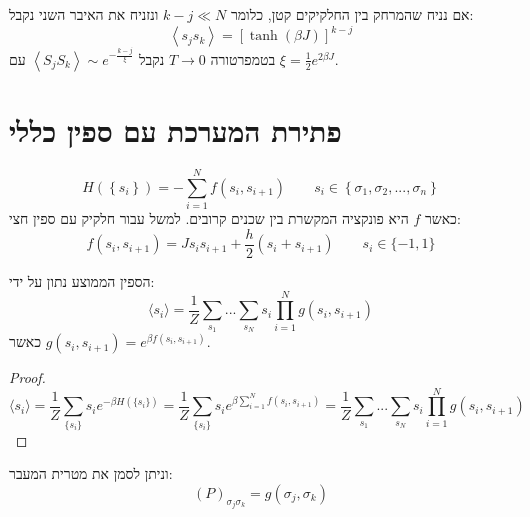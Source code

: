 \documentclass{tstextbook}
\begin{document}
\begin{corollary}
אם נניח שהמרחק בין החלקיקים קטן, כלומר \(k-j\ll N\) ונזניח את האיבר השני נקבל:
$$\left\langle s_{j}s_{k}\right\rangle=\left[\operatorname{tanh}\left(\beta J\right)\right]^{k-j}$$
בטמפרטורה \(T\to 0\) נקבל \(\left\langle S_{j}S_{k}\right\rangle\sim e^{-\frac{k-j}{\xi}}\) עם \(\xi=\frac{1}{2}e^{ 2\beta J }\).

\end{corollary}
\section{פתירת המערכת עם ספין כללי}

\begin{definition}
$$H\left(\left\{s_{i}\right\}\right)=-\sum_{i=1}^{N}f\left(s_{i},s_{i+1}\right)\qquad s_{i}\in\left\{\sigma_{1},\sigma_{2},...,\sigma_{n}\right\}$$
כאשר \(f\) היא פונקציה המקשרת בין שכנים קרובים. למשל עבור חלקיק עם ספין חצי:
$$f\left(s_{i},s_{i+1}\right)=J s_{i}s_{i+1}+{\frac{h}{2}}\left(s_{i}+s_{i+1}\right)\qquad s_{i}\in\{-1,1\}$$

\end{definition}
\begin{proposition}
הספין הממוצע נתון על ידי:
$$\langle s_{i} \rangle  =\frac{1}{Z}\sum_{s_{1}}...\sum_{s_{N}}s_{i}\prod_{i=1}^{N}g\left(s_{i},s_{i+1}\right)$$
כאשר \(g\left(s_{i},s_{i+1}\right)=e^{\beta f(s_{i},s_{i+1})}\).

\end{proposition}
\begin{proof}
$$\langle s_{i}\rangle=\frac{1}{Z}\sum_{\{s_{i}\}}s_{i}e^{-\beta H(\{s_{i}\})}={\frac{1}{Z}}\sum_{\{s_{i}\}}s_{i}e^{\beta\sum_{i=1}^{N}f(s_{i},s_{i+1})}=\frac{1}{Z}\sum_{s_{1}}...\sum_{s_{N}}s_{i}\prod_{i=1}^{N}g\left(s_{i},s_{i+1}\right)$$

\end{proof}
וניתן לסמן את מטרית המעבר:
$$(P)_{\sigma_{j}\sigma_{k}}=g\left( \sigma_{j},\sigma_{k} \right)$$
\end{document}
